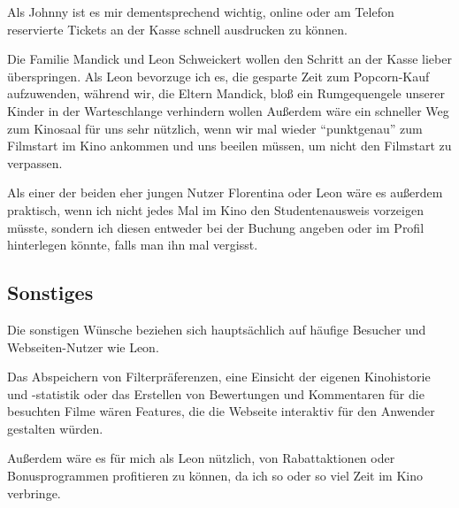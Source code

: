 Als Johnny ist es mir dementsprechend wichtig, online oder am Telefon reservierte Tickets an der Kasse schnell ausdrucken zu können.

Die Familie Mandick und Leon Schweickert wollen den Schritt an der Kasse lieber überspringen.
Als Leon bevorzuge ich es, die gesparte Zeit zum Popcorn-Kauf aufzuwenden, während wir, die Eltern Mandick, bloß ein Rumgequengele unserer Kinder in der Warteschlange verhindern wollen
Außerdem wäre ein schneller Weg zum Kinosaal für uns sehr nützlich, wenn wir mal wieder \enquote{punktgenau} zum Filmstart im Kino ankommen und uns beeilen müssen, um nicht den Filmstart zu verpassen.

Als einer der beiden eher jungen Nutzer Florentina oder Leon wäre es außerdem praktisch, wenn ich nicht jedes Mal im Kino den Studentenausweis vorzeigen müsste, sondern ich diesen entweder bei der Buchung angeben oder im Profil hinterlegen könnte, falls man ihn mal vergisst.

\subsection{Sonstiges}
Die sonstigen Wünsche beziehen sich hauptsächlich auf häufige Besucher und Webseiten-Nutzer wie Leon.

Das Abspeichern von Filterpräferenzen, eine Einsicht der eigenen Kinohistorie und -statistik oder das Erstellen von Bewertungen und Kommentaren für die besuchten Filme wären Features, die die Webseite interaktiv für den Anwender gestalten würden.

Außerdem wäre es für mich als Leon nützlich, von Rabattaktionen oder Bonusprogrammen profitieren zu können, da ich so oder so viel Zeit im Kino verbringe.
